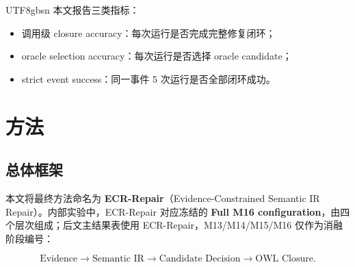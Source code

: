 \documentclass[11pt]{article}
\begin{document}
\begin{CJK*}{UTF8}{gbsn}
本文报告三类指标：

\begin{itemize}
    \item 调用级 closure accuracy：每次运行是否完成完整修复闭环；
    \item oracle selection accuracy：每次运行是否选择 oracle candidate；
    \item strict event success：同一事件 5 次运行是否全部闭环成功。
\end{itemize}

\section{方法}

\subsection{总体框架}

本文将最终方法命名为 \textbf{ECR-Repair}（Evidence-Constrained Semantic IR Repair）。内部实验中，ECR-Repair 对应冻结的 \textbf{Full M16 configuration}，由四个层次组成；后文主结果表使用 ECR-Repair，M13/M14/M15/M16 仅作为消融阶段编号：

\[
\text{Evidence} \rightarrow \text{Semantic IR} \rightarrow \text{Candidate Decision} \rightarrow \text{OWL Closure}.
\]


\end{CJK*}
\end{document}
